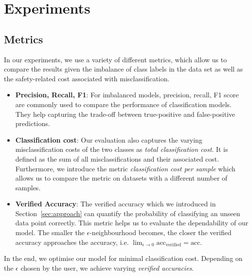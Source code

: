 \documentclass[acmsmall,nonacm]{acmart}
\begin{document}

\section{Experiments}


\subsection{Metrics}
In our experiments, we use a variety of different metrics, which allow us to compare the results given the imbalance of class labels in the data set as well as the safety-related cost associated with misclassification.

\begin{itemize}
	\item \textbf{Precision, Recall, F1}: For imbalanced models, precision, recall, F1 score are commonly used to compare the performance of classification models. They help capturing the trade-off between true-positive and false-positive predictions. 
	\item \textbf{Classification cost}: Our evaluation also captures the varying misclassification costs of the two classes as \textit{total classification cost}. It is defined as the sum of all misclassifications and their associated cost. Furthermore, we introduce the metric \textit{classification cost per sample} which allows us to compare the metric on datasets with a different number of samples. 
	\item \textbf{Verified Accuracy}: The verified accuracy which we introduced in Section~\ref{sec:approach} can quantify the probability of classifying an unseen data point correctly. This metric helps us to evaluate the dependability of our model. The smaller the $\epsilon$-neighbourhood becomes, the closer the verified accuracy approaches the accuracy, i.e. $\lim_{\epsilon \to 0} \text{acc}_{\text{verified}} = \text{acc}$.
\end{itemize}

In the end, we optimise our model for minimal classification cost. Depending on the $\epsilon$ chosen by the user, we achieve varying \textit{verified accuracies}.
\end{document}
